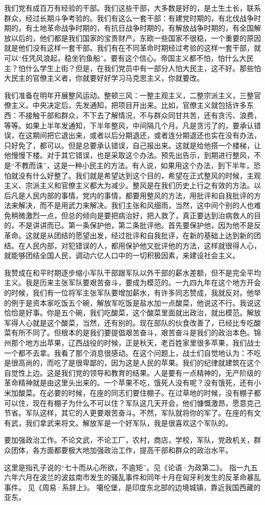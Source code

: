 我们党有成百万有经验的干部。我们这些干部，大多数是好的，是土生土长，联系群众，经过长期斗争考验的。我们有这么一套干部：有建党时期的，有北伐战争时期的，有土地革命战争时期的，有抗日战争时期的，有解放战争时期的，有全国解放以后的，他们都是我们国家的宝贵财产。东欧一些国家不很稳，一个重要的原因就是他们没有这样一套干部。我们有在不同革命时期经过考验的这样一套干部，就可以“任凭风浪起，稳坐钓鱼船”。要有这个信心。帝国主义都不怕，怕什么大民主？怕什么学生上街？但是，在我们党员中有一部分人怕大民主，这不好。那些怕大民主的官僚主义者，你就要好好学习马克思主义，你就要改。

我们准备在明年开展整风运动。整顿三风：一整主观主义，二整宗派主义，三整官僚主义。中央决定后，先发通知，把项目开出来。比如，官僚主义就包括许多东西：不接触干部和群众，不下去了解情况，不与群众同甘共苦，还有贪污、浪费，等等。如果上半年发通知，下半年整风，中间隔几个月。凡是贪污了的，要承认错误，在这期间把它退出来，或者以后分期退还，或者连分期退还也实在没有办法，只好免了，都可以。但是总要承认错误，自己报出来。这就是给他搭一个楼梯，让他慢慢下楼。对于其它错误，也是采取这个办法。预先出告示，到期进行整风，不是“不教而诛”，这是一种小民主的方法。有人说，如果用这个办法，到下半年，恐怕就没有什么好整了。我们就是希望达到这个目的，希望在正式整风的时候，主观主义、宗派主义和官僚主义都大为减少。整风是在我们历史上行之有效的方法。以后凡是人民内部的事情，党内的事情，都要用整风的方法，用批评和自我批评的方法来解决，而不是用武力来解决。我们主张和风细雨，当然，这中间个别的人也难免稍微激烈一点，但总的倾向是要把病治好，把人救了，真正要达到治病救人的目的，不是讲讲而已。第一条保护他，第二条批评他。首先要保护他，因为他不是反革命。这就是从团结的愿望出发，经过批评和自我批评，在新的基础上达到新的团结。在人民内部，对犯错误的人，都用保护他又批评他的方法，这样就很得人心，就能够团结全国人民，调动六亿人口中的一切积极因素，来建设社会主义。

我赞成在和平时期逐步缩小军队干部跟军队以外干部的薪水差额，但不是完全平均主义。我是历来主张军队要艰苦奋斗，要成为模范的。一九四九年在这个地方开会的时候，我们有一位将军主张军队要增加薪水，有许多同志赞成，我就反对。他举的例于是资本家吃饭五个碗，解放军吃饭是盐水加一点酸菜，他说这不行。我说这恰恰是好事。你是五个碗，我们吃酸菜，这个酸菜里面就出政治，就出模范。解放军得人心就是这个酸菜，当然，还有别的。现在部队的伙食改善了，已经比专吃酸菜有所不同了。但根本的是我们要提倡艰苦奋斗，艰苦奋斗是我们的政治本色。锦州那个地方出苹果，辽西战役的时候，正是秋天，老百姓家里很多苹果，我们战士一个都不去拿。我看了那个消息很感动。在这个问题上，战士们自觉地认为：不吃是很高尚的，而吃了是很卑鄙的，因为这是人民的苹果。我们的纪律就建筑在这个自觉性上边。这是我们党的领导和教育的结果。人是要有一点精神的，无产阶级的革命精神就是由这里头出来的。一个苹果不吃，饿死人没有呢？没有饿死，还有小米加酸菜。在必要的时候，在座的同志们要住棚子。在过草地的时候，没有棚子都可以住，现在有棚子为什么不可以住？军队这几天开会，他们慷慨激昂，愿意克己节省。军队这样，其它的人更要艰苦奋斗。不然，军队就将你的军了。在座的有文有武，我们拿武来将文。解放军是一个好军队，我是很喜欢这个军队的。

要加强政治工作。不论文武，不论工厂，农村，商店，学校，军队，党政机关，群众团体，各方面都要极大地加强政治工作，提高干部和群众的政治水平。


\begin{maonote}
这里是指孔子说的“七十而从心所欲，不逾矩”。见《论语·为政第二》。
指一九五六年六月在波兰的波兹南市发生的骚乱事件和同年十月在匈牙利发生的反革命暴乱事件。
见《周易·系辞上》。
噶伦堡，是印度东北部的边境城镇，靠近我国西藏的亚东。
\end{maonote}
